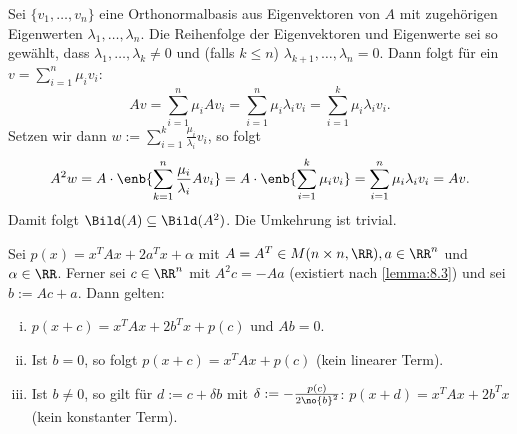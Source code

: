 \begin{beweis}
	Sei $\{v_1,\dots,v_n\}$ eine Orthonormalbasis aus Eigenvektoren von $A$ mit zugehörigen Eigenwerten $\lambda_1,\dots,\lambda_n$.
	Die Reihenfolge der Eigenvektoren und Eigenwerte sei so gewählt, dass $\lambda_1,\dots,\lambda_k \neq 0$ und (falls $k \leq n$) $\lambda_{k+1}, \dots, \lambda_n = 0$.
	Dann folgt für ein $v = \sum_{i=1}^{n} \mu_i v_i$:
	\[
		Av = \sum_{i=1}^{n} \mu_i Av_i = \sum_{i=1}^{n} \mu_i \lambda_i v_i = \sum_{i=1}^{k} \mu_i \lambda_i v_i.
	\]
	Setzen wir dann $w := \sum_{i=1}^{k} \frac{\mu_i}{\lambda_i} v_i$, so folgt
	\[
		A^2w = A \cdot \enb{\sum_{k=1}^{n} \frac{\mu_i}{\lambda_i} Av_i} = A \cdot \enb{\sum_{i=1}^{k} \mu_i v_i} = \sum_{i=1}^{n} \mu_i \lambda_i v_i = Av.
	\]
	Damit folgt $\Bild(A) \subseteq \Bild(A^2)$.
	Die Umkehrung ist trivial. 
\end{beweis}

\begin{lemma}
	\label{lemma:8.4}
	Sei $p(x) = x^T A x + 2a^Tx + \alpha$ mit $A = A^T \in M(n \times n, \RR), a \in \RR^n$ und $\alpha \in \RR$.
	Ferner sei $c \in \RR^n$ mit $A^2c = -Aa$ (existiert nach \autoref{lemma:8.3}) und sei $b := Ac + a$.
	Dann gelten:
	\begin{enumerate}[(i)]
		\item $p(x+c) = x^T Ax + 2b^Tx + p(c)$ und $Ab = 0$.
		\item Ist $b = 0$, so folgt $p(x+c) = x^TAx + p(c)$ (kein linearer Term).
		\item Ist $b \neq 0$, so gilt für $d := c+\delta b$ mit $\delta := - \frac{p(c)}{2 \no{b}^2}$: $p(x+d) = x^TAx + 2b^Tx$ (kein konstanter Term).
	\end{enumerate}
\end{lemma}

